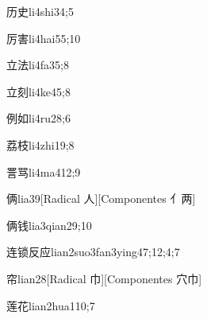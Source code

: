\begin{verbete}{历史}{li4shi3}{4;5}
\end{verbete}

\begin{verbete}{厉害}{li4hai5}{5;10}
\end{verbete}

\begin{verbete}{立法}{li4fa3}{5;8}
\end{verbete}

\begin{verbete}{立刻}{li4ke4}{5;8}
\end{verbete}

\begin{verbete}{例如}{li4ru2}{8;6}
\end{verbete}

\begin{verbete}{荔枝}{li4zhi1}{9;8}
\end{verbete}

\begin{verbete}{詈骂}{li4ma4}{12;9}
\end{verbete}

\begin{verbete}{俩}{lia3}{9}[Radical 人][Componentes 亻两]
\end{verbete}

\begin{verbete}{俩钱}{lia3qian2}{9;10}
\end{verbete}

\begin{verbete}{连锁反应}{lian2suo3fan3ying4}{7;12;4;7}
\end{verbete}

\begin{verbete}{帘}{lian2}{8}[Radical 巾][Componentes 穴巾]
\end{verbete}

\begin{verbete}{莲花}{lian2hua1}{10;7}
\end{verbete}

